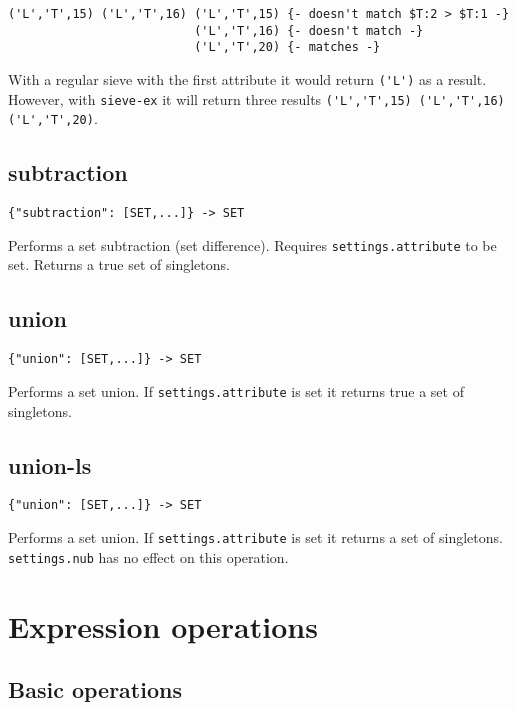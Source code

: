 \documentclass[a4paper]{article}
\begin{document}
\begin{verbatim}
('L','T',15) ('L','T',16) ('L','T',15) {- doesn't match $T:2 > $T:1 -}
                          ('L','T',16) {- doesn't match -}
                          ('L','T',20) {- matches -}
\end{verbatim}

With a regular sieve with the first attribute it would return \verb|('L')| as a result. However, with \verb|sieve-ex| it will return
three results \verb|('L','T',15) ('L','T',16) ('L','T',20)|.

\subsection{subtraction}

\begin{verbatim}
{"subtraction": [SET,...]} -> SET
\end{verbatim}

Performs a set subtraction (set difference). Requires
\verb|settings.attribute| to be set. Returns a true set of singletons.

\subsection{union}

\begin{verbatim}
{"union": [SET,...]} -> SET
\end{verbatim}

Performs a set union. If \verb|settings.attribute| is set it returns true a
set of singletons.

\subsection{union-ls}

\begin{verbatim}
{"union": [SET,...]} -> SET
\end{verbatim}

Performs a set union. If \verb|settings.attribute| is set it returns a
set of singletons. \verb|settings.nub| has no effect on this operation. 

\section{Expression operations}

\subsection{Basic operations}
\end{document}

